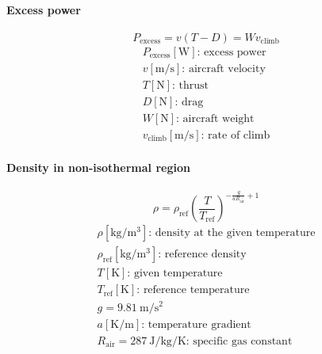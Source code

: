\documentclass[10pt, twocolumn]{article}
\begin{document}
\paragraph{Excess power}
\[
  P_\mathrm{excess} = v(T - D) = W v_\mathrm{climb}
\]
\[
  \begin{array}{|l}
    P_\mathrm{excess} [\si{\watt}] \text{: excess power}  \\
    v [\si{\meter\per\second}] \text{: aircraft velocity} \\
    T [\si{\newton}] \text{: thrust}                      \\
    D [\si{\newton}] \text{: drag}                        \\
    W [\si{\newton}] \text{: aircraft weight}             \\
    v_\mathrm{climb} [\si{\metre\per\second}] \text{: rate of climb}
  \end{array}
\]

\paragraph{Density in non-isothermal region}
\[
  \rho = \rho_\mathrm{ref} \left( \frac{T}{T_\mathrm{ref}} \right)^{-\frac{g}{aR_\mathrm{air}} + 1}
\]
\[
  \begin{array}{|l}
    \rho [\si{\kilogram\per\metre\cubed}] \text{: density at the given temperature} \\
    \rho_\mathrm{ref} [\si{\kilogram\per\metre\cubed}] \text{: reference density}   \\
    T [\si{\kelvin}] \text{: given temperature}                                     \\
    T_\mathrm{ref} [\si{\kelvin}] \text{: reference temperature}                    \\
    g = \SI{9.81}{\metre\per\second\squared}                                        \\
    a [\si{\kelvin\per\metre}] \text{: temperature gradient}                        \\
    R_\mathrm{air} = \SI[scientific-notation = false]{287}{\joule\per\kilogram\per\kelvin} \text{: specific gas constant}
  \end{array}
\]
\end{document}
